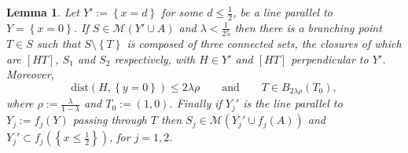\documentclass{amsart}
\newcommand{\ENCLOSE}[1]{\left\{#1\right\}}
\newcommand{\M}{\mathcal{M}}
\newcommand{\dist}{\mathrm{dist}}
\newtheorem{lemma}[theorem]{Lemma}
\theoremstyle{definition}
\theoremstyle{remark}
\begin{document}
\begin{lemma}\label{lm:branching}
  Let $Y':=\ENCLOSE{x=d}$ for some $d\le\frac 1 2$,
  be a line parallel to $Y=\ENCLOSE{x=0}$.
  If $S\in \M(Y'\cup A)$
  and $\lambda < \frac 1 {25}$ then
  there is a branching point $T\in S$ 
  such that $S\setminus \ENCLOSE{T}$ is composed of 
  three connected sets, the closures of which are
   $[HT]$, $S_1$ and $S_2$ respectively,
  with $H\in Y'$ and $[HT]$ perpendicular to $Y'$.  
  Moreover, 
  \begin{equation}\label{eq:474947}
    \dist(H,\ENCLOSE{y=0})\le 2\lambda\rho
    \qquad\text{and}\qquad 
    T\in B_{2\lambda\rho}(T_0), 
  \end{equation}
  where $\rho:=\frac{\lambda}{1-\lambda}$ and $T_0:=(1,0)$.
  Finally if $Y_j'$ is the line parallel to $Y_j:=f_j(Y)$ 
  passing through $T$ 
  then $S_j \in \M(Y_j'\cup f_j(A))$ 
  and $Y_j'\subset f_j(\ENCLOSE{x\le\frac 1 2})$,
  for $j=1,2$.
\end{lemma}
\end{document}
